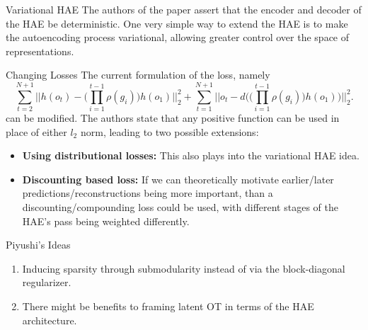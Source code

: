 \documentclass{beamer}
\begin{document}

  \begin{frame}{Variational HAE}
    The authors of the paper assert that the encoder and decoder of the HAE be deterministic. One very simple way to extend the HAE is to make the autoencoding process variational, allowing greater control over the space of representations.
  \end{frame}
  \begin{frame}{Changing Losses}
    The current formulation of the loss, namely 
    \[ 
      \sum_{t = 2}^{N+1} \biggl|\biggl| h(o_t) - \bigl(\prod_{i = 1}^{t-1}\rho(g_i)\bigr)h(o_1)   \biggr|\biggr|_2^2 + \sum_{t=1}^{N+1} \biggl|\biggl| o_t - d\biggl( \bigl(\prod_{i = 1}^{t-1}\rho(g_i)\bigr)h(o_1)\biggr)    \biggr|\biggr|_2^2
    .\]
    can be modified. The authors state that any positive function can be used in place of either $l_2$ norm, leading to two possible extensions:
    \begin{itemize}
    \item \textbf{Using distributional losses:} This also plays into the variational HAE idea.
    \item \textbf{Discounting based loss:} If we can theoretically motivate earlier/later predictions/reconstructions being more important, than a discounting/compounding loss could be used, with different stages of the HAE's pass being weighted differently.
    \end{itemize}
  \end{frame}
    
  \begin{frame}{Piyushi's Ideas}
    \begin{enumerate}
      \item Inducing sparsity through submodularity instead of via the block-diagonal regularizer.
      \item There might be benefits to framing latent OT in terms of the HAE architecture.
    \end{enumerate}
  \end{frame}
\end{document}
